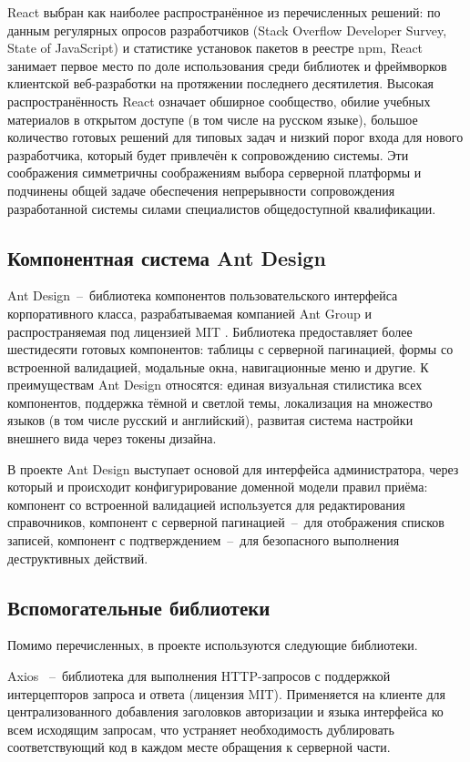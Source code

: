 React выбран как наиболее распространённое из перечисленных решений: по данным регулярных опросов разработчиков (Stack Overflow Developer Survey, State of JavaScript) и статистике установок пакетов в реестре npm, React занимает первое место по доле использования среди библиотек и фреймворков клиентской веб-разработки на протяжении последнего десятилетия.
Высокая распространённость React означает обширное сообщество, обилие учебных материалов в открытом доступе (в том числе на русском языке), большое количество готовых решений для типовых задач и низкий порог входа для нового разработчика, который будет привлечён к сопровождению системы.
Эти соображения симметричны соображениям выбора серверной платформы и подчинены общей задаче обеспечения непрерывности сопровождения разработанной системы силами специалистов общедоступной квалификации.

\subsection{Компонентная система Ant Design}

Ant Design~--~библиотека компонентов пользовательского интерфейса корпоративного класса, разрабатываемая компанией Ant Group и распространяемая под лицензией MIT .
Библиотека предоставляет более шестидесяти готовых компонентов: таблицы с серверной пагинацией, формы со встроенной валидацией, модальные окна, навигационные меню и другие.
К преимуществам Ant Design относятся: единая визуальная стилистика всех компонентов, поддержка тёмной и светлой темы, локализация на множество языков (в том числе русский и английский), развитая система настройки внешнего вида через токены дизайна.

В проекте Ant Design выступает основой для интерфейса администратора, через который и происходит конфигурирование доменной модели правил приёма: компонент  со встроенной валидацией используется для редактирования справочников, компонент  с серверной пагинацией~--~для отображения списков записей, компонент  с подтверждением~--~для безопасного выполнения деструктивных действий.

\subsection{Вспомогательные библиотеки}

Помимо перечисленных, в проекте используются следующие библиотеки.

Axios ~--~библиотека для выполнения HTTP-запросов с поддержкой интерцепторов запроса и ответа (лицензия MIT).
Применяется на клиенте для централизованного добавления заголовков авторизации и языка интерфейса ко всем исходящим запросам, что устраняет необходимость дублировать соответствующий код в каждом месте обращения к серверной части.

